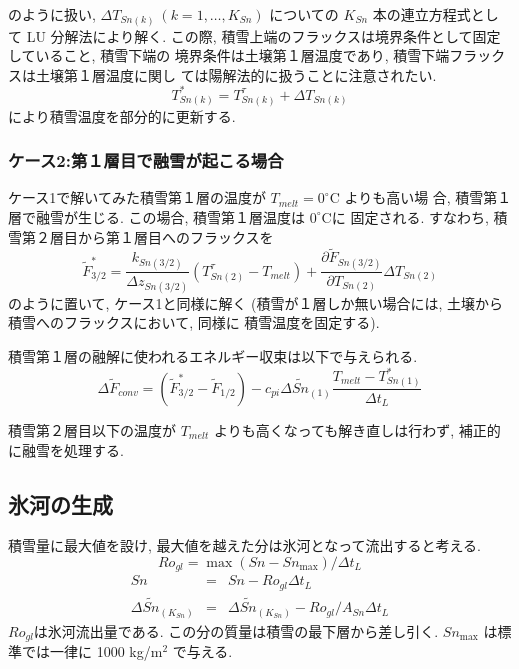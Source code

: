 のように扱い, $\Delta T_{Sn(k)}\ (k=1,\ldots,K_{Sn})$ についての
$K_{Sn}$ 本の連立方程式として LU 分解法により解く.
この際, 積雪上端のフラックスは境界条件として固定していること, 積雪下端の
境界条件は土壌第１層温度であり, 積雪下端フラックスは土壌第１層温度に関し
ては陽解法的に扱うことに注意されたい.
\begin{equation}
 T_{Sn(k)}^* = T_{Sn(k)}^{\tau} + \Delta T_{Sn(k)}
\end{equation}
により積雪温度を部分的に更新する.

\subsubsection{ケース2:第１層目で融雪が起こる場合}

ケース1で解いてみた積雪第１層の温度が $T_{melt} = 0^{\circ}$C よりも高い場
合, 積雪第１層で融雪が生じる. この場合, 積雪第１層温度は $0^{\circ}$Cに
固定される. すなわち, 積雪第２層目から第１層目へのフラックスを
\begin{equation}
 \widetilde{F}_{3/2}^{*} =
\frac{k_{Sn(3/2)}}{\Delta z_{Sn(3/2)}} (T_{Sn(2)}^{\tau} - T_{melt})
+\frac{\partial \widetilde{F}_{Sn(3/2)}}{\partial T_{Sn(2)}}
 \Delta T_{Sn(2)}
\end{equation}
のように置いて, ケース1と同様に解く
(積雪が１層しか無い場合には, 土壌から積雪へのフラックスにおいて, 同様に
積雪温度を固定する).

積雪第１層の融解に使われるエネルギー収束は以下で与えられる.
\begin{equation}
 \Delta \widetilde{F}_{conv} = (\widetilde{F}_{3/2}^{*} - \widetilde{F}_{1/2})
  - c_{pi}\Delta \widetilde{Sn}_{(1)} \frac{T_{melt}-T_{Sn(1)}^*}{\Delta t_L}
\end{equation}

積雪第２層目以下の温度が $T_{melt}$ よりも高くなっても解き直しは行わず,
補正的に融雪を処理する.

\subsection{氷河の生成}

積雪量に最大値を設け, 最大値を越えた分は氷河となって流出すると考える.
\begin{equation}
 Ro_{gl} = \max( Sn - Sn_{\max} ) / \Delta t_L
\end{equation}
\begin{eqnarray}
 Sn &=& Sn - Ro_{gl} \Delta t_L \\
 \Delta \widetilde{Sn}_{(K_{Sn})} &=& \Delta \widetilde{Sn}_{(K_{Sn})}
 - Ro_{gl} / A_{Sn} \Delta t_L
\end{eqnarray}
$Ro_{gl}$は氷河流出量である. この分の質量は積雪の最下層から差し引く.
$Sn_{\max}$ は標準では一律に 1000 kg/m$^2$ で与える.

